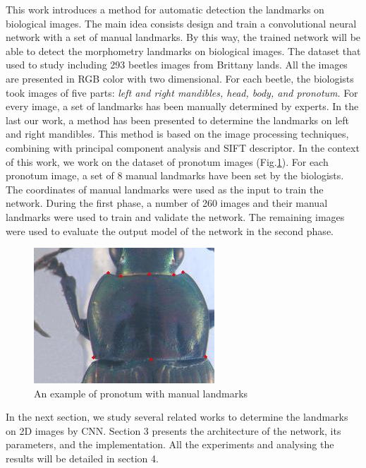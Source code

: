 \documentclass[conference]{IEEEtran}
\begin{document}
This work introduces a method for automatic detection the landmarks on biological images. The main idea consists design and train a convolutional neural network\cite{lecun2010convolutional} with a set of manual landmarks. By this way, the trained network will be able to detect the morphometry landmarks on biological images. The dataset that used to study including 293 beetles images from Brittany lands. All the images are presented in RGB color with two dimensional. For each beetle, the biologists took images of five parts: \textit{left and right mandibles, head, body, and pronotum}. For every image, a set of landmarks has been manually determined by experts. In the last our work, a method has been presented to determine the landmarks on left and right mandibles\cite{le2017maelab}. This method is based on the image processing techniques\cite{canny1986computational}, combining with principal component analysis\cite{shlens2014tutorial} and SIFT descriptor\cite{lowe2004distinctive}. In the context of this work, we work on the dataset of pronotum images (Fig.\ref{figpronotum}). For each pronotum image, a set of 8 manual landmarks have been set by the biologists. The coordinates of manual landmarks were used as the input to train the network. During the first phase, a number of 260 images and their manual landmarks were used to train and validate the network. The remaining images were used to evaluate the output model of the network in the second phase.
\begin{figure}[htbp]
	\centerline{\includegraphics[scale=0.8]{images/pronotum}}
	\caption{An example of pronotum with manual landmarks}
	\label{figpronotum}
\end{figure}

In the next section, we study several related works to determine the landmarks on 2D images by CNN. Section 3 presents the architecture of the network, its parameters, and the implementation. All the experiments and analysing the results will be detailed in section 4.
\end{document}
